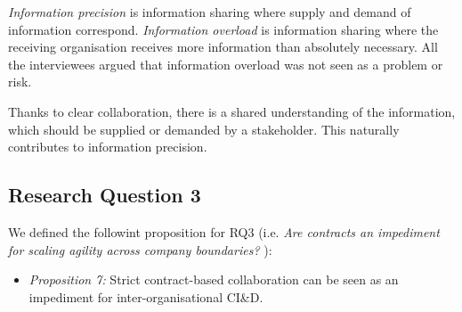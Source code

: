 {\em Information precision} is information sharing where supply and demand of information correspond. {\em Information overload} is information sharing where the receiving organisation receives more information than absolutely necessary. 
All the interviewees argued that information overload was not seen as a problem or risk.

Thanks to clear collaboration, there is a shared understanding of the information, which should be supplied or demanded by a stakeholder. This naturally contributes to information precision.

\subsection{Research Question 3}\label{sec:ResearchQuestion3}

We defined the followint proposition for  
RQ3 (i.e. {\em Are contracts an impediment for scaling agility across company boundaries? %
}):

\begin{itemize}
\item \emph{Proposition 7: }{Strict contract-based collaboration can be seen as an impediment for inter-organisational CI\&D.}%
\end{itemize}


